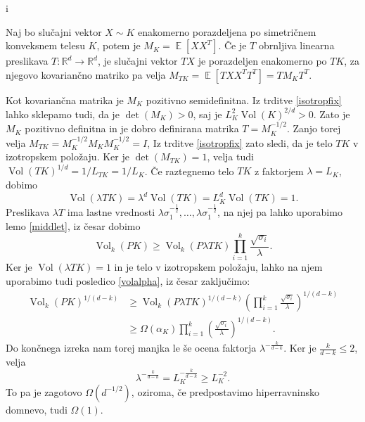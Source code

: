i\documentclass[mat1]{fmfdelo}
\newcommand{\R}{\mathbb R}
\DeclareMathOperator*{\E}{\mathbb E}
\DeclareMathOperator{\Vol}{Vol}
\begin{document}
\begin{dokaz}
    Naj bo slučajni vektor $X\sim K$ enakomerno porazdeljena po simetričnem konveksnem telesu $K$, potem je $M_K=\E[XX^T]$. Če je $T$ obrnljiva linearna preslikava $T: \R^d \to \R^d$, je slučajni vektor $TX$ je porazdeljen enakomerno po $TK$, za njegovo kovariančno matriko pa velja $M_{TK}=\E[TXX^TT^T]=T M_K T^T$.
    
    Kot kovariančna matrika je $M_K$ pozitivno semidefinitna. Iz trditve \ref{isotropfix} lahko sklepamo tudi, da je $\det(M_K)>0$, saj je $L_K^2 \Vol(K)^{2/d}>0$. Zato je $M_K$ pozitivno definitna in je dobro definirana matrika $T= M_K^{-1/2}$. Zanjo torej velja $M_{TK}= M_K^{-1/2} M_K M_K^{-1/2} = I$,  Iz trditve \ref{isotropfix} zato sledi, da je telo $TK$ v izotropskem položaju. Ker je $\det(M_{TK})=1$, velja tudi $\Vol(TK)^{1/d} = 1/L_{TK} = 1/L_K$.
    Če raztegnemo telo $TK$ z faktorjem $\lambda = L_K$, dobimo
    \begin{equation*}
        \Vol(\lambda TK)=\lambda^d \Vol(TK)=L_K^d \Vol(TK)=1.
    \end{equation*}
    Preslikava $\lambda T$ ima lastne vrednosti $\lambda \sigma_1^{-\frac{1}{2}},\dots,\lambda \sigma_1^{-\frac{1}{2}}$, na njej pa lahko uporabimo lemo \ref{middlet}, iz česar dobimo
    \begin{equation*}
        \Vol_k(PK) \geq \Vol_k(P\lambda TK) \prod_{i=1}^k \frac{\sqrt{\sigma_i}}{\lambda}.
    \end{equation*}
    Ker je $\Vol(\lambda TK) = 1$ in je telo v izotropskem položaju, lahko na njem uporabimo tudi posledico \ref{volalpha}, iz česar zaključimo:
    \begin{align*}
        \Vol_k(PK)^{1/(d-k)} &\geq \Vol_k(P\lambda TK)^{1/(d-k)} \left(\prod_{i=1}^k \frac{\sqrt{\sigma_i}}{\lambda}\right)^{1/(d-k)} \\
        &\geq \Omega(\alpha_K) \prod_{i=1}^k \left(\frac{\sqrt{\sigma_i}}{\lambda}\right)^{1/(d-k)}.
    \end{align*}
    Do končnega izreka nam torej manjka le še ocena faktorja $\lambda^{-\frac{k}{d-k}}$. Ker je $\frac{k}{d-k} \leq 2$, velja
    \begin{equation*}
        \lambda^{-\frac{k}{d-k}} = L_K^{-\frac{k}{d-k}} \geq L_K^{-2}.
    \end{equation*}
    To pa je zagotovo $\Omega(d^{-1/2})$, oziroma, če predpostavimo hiperravninsko domnevo, tudi $\Omega(1)$.
\end{dokaz}
\end{document}
